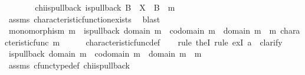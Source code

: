 \begin{isabellebody}
%
\isadelimproof
%
\endisadelimproof
%
\isatagproof
{}\isamarkupfalse%
\ {\isacharminus}{\kern0pt}\isanewline
\ \ \isamarkupfalse%
\ {\isasymchi}\ \ chi{\isacharunderscore}{\kern0pt}is{\isacharunderscore}{\kern0pt}pullback{\isacharcolon}{\kern0pt}\ {\isachardoublequoteopen}is{\isacharunderscore}{\kern0pt}pullback\ B\ {\isasymone}\ X\ {\isasymOmega}\ {\isacharparenleft}{\kern0pt}{\isasymbeta}\isactrlbsub B\isactrlesub {\isacharparenright}{\kern0pt}\ {\isasymt}\ m\ {\isasymchi}{\isachardoublequoteclose}\isanewline
\ \ \ \ \isamarkupfalse%
\ assms\ characteristic{\isacharunderscore}{\kern0pt}function{\isacharunderscore}{\kern0pt}exists\ \isamarkupfalse%
\ blast\isanewline
\isanewline
\ \ \isamarkupfalse%
\ {\isachardoublequoteopen}monomorphism\ m\ {\isasymlongrightarrow}\ is{\isacharunderscore}{\kern0pt}pullback\ {\isacharparenleft}{\kern0pt}domain\ m{\isacharparenright}{\kern0pt}\ {\isasymone}\ {\isacharparenleft}{\kern0pt}codomain\ m{\isacharparenright}{\kern0pt}\ {\isasymOmega}\ {\isacharparenleft}{\kern0pt}{\isasymbeta}\isactrlbsub domain\ m\isactrlesub {\isacharparenright}{\kern0pt}\ {\isasymt}\ m\ {\isacharparenleft}{\kern0pt}characteristic{\isacharunderscore}{\kern0pt}func\ m{\isacharparenright}{\kern0pt}{\isachardoublequoteclose}\isanewline
\ \ \ \ \isamarkupfalse%
\ characteristic{\isacharunderscore}{\kern0pt}func{\isacharunderscore}{\kern0pt}def\isanewline
\ \ \isamarkupfalse%
\ {\isacharparenleft}{\kern0pt}rule\ theI{\isacharprime}{\kern0pt}{\isacharcomma}{\kern0pt}\ rule\ ex{}I{\isacharbrackleft}{\kern0pt}\ a{\isacharequal}{\kern0pt}\ {\isasymchi}{\isacharbrackright}{\kern0pt}{\isacharcomma}{\kern0pt}\ clarify{\isacharparenright}{\kern0pt}\isanewline
\ \ \ \ \isamarkupfalse%
\ {\isachardoublequoteopen}is{\isacharunderscore}{\kern0pt}pullback\ {\isacharparenleft}{\kern0pt}domain\ m{\isacharparenright}{\kern0pt}\ {\isasymone}\ {\isacharparenleft}{\kern0pt}codomain\ m{\isacharparenright}{\kern0pt}\ {\isasymOmega}\ {\isacharparenleft}{\kern0pt}{\isasymbeta}\isactrlbsub domain\ m\isactrlesub {\isacharparenright}{\kern0pt}\ {\isasymt}\ m\ {\isasymchi}{\isachardoublequoteclose}\isanewline
\ \ \ \ \ \ \isamarkupfalse%
\ assms{\isacharparenleft}{\kern0pt}{}{\isacharparenright}{\kern0pt}\ cfunc{\isacharunderscore}{\kern0pt}type{\isacharunderscore}{\kern0pt}def\ chi{\isacharunderscore}{\kern0pt}is{\isacharunderscore}{\kern0pt}pullback\ \isamarkupfalse%

\end{isabellebody}
